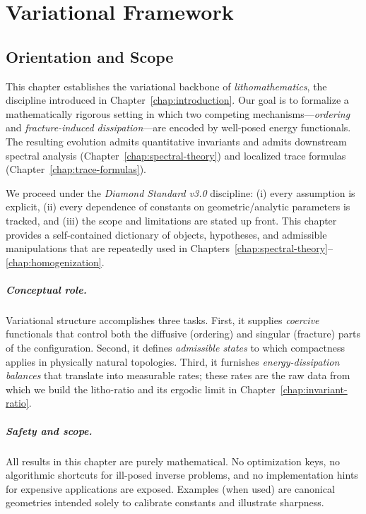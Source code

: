 \chapter{Variational Framework}\label{chap:variational}

\section{Orientation and Scope}\label{sec:var-orientation}
This chapter establishes the variational backbone of \emph{lithomathematics}, the discipline introduced in Chapter~\ref{chap:introduction}.
Our goal is to formalize a mathematically rigorous setting in which two competing mechanisms---\emph{ordering} and \emph{fracture-induced dissipation}---are encoded by well-posed energy functionals.
The resulting evolution admits quantitative invariants and admits downstream spectral analysis (Chapter~\ref{chap:spectral-theory}) and localized trace formulas (Chapter~\ref{chap:trace-formulas}).

\medskip
We proceed under the \emph{Diamond Standard v3.0} discipline:
(i) every assumption is explicit, (ii) every dependence of constants on geometric/analytic parameters is tracked, and (iii) the scope and limitations are stated up front. This chapter provides a self-contained dictionary of objects, hypotheses, and admissible manipulations that are repeatedly used in Chapters~\ref{chap:spectral-theory}--\ref{chap:homogenization}.

\paragraph{Conceptual role.}
Variational structure accomplishes three tasks.
First, it supplies \emph{coercive} functionals that control both the diffusive (ordering) and singular (fracture) parts of the configuration.
Second, it defines \emph{admissible states} to which compactness applies in physically natural topologies.
Third, it furnishes \emph{energy-dissipation balances} that translate into measurable rates; these rates are the raw data from which we build the litho-ratio and its ergodic limit in Chapter~\ref{chap:invariant-ratio}.

\paragraph{Safety and scope.}
All results in this chapter are purely mathematical.
No optimization keys, no algorithmic shortcuts for ill-posed inverse problems, and no implementation hints for expensive applications are exposed.
Examples (when used) are canonical geometries intended solely to calibrate constants and illustrate sharpness.

